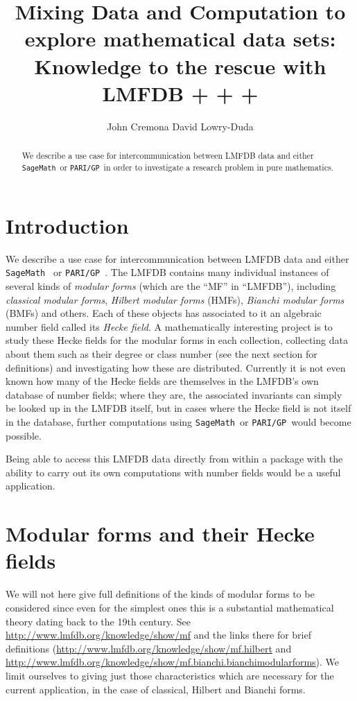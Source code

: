 \documentclass{llncs}
\title{Mixing Data and Computation to explore mathematical data sets:
Knowledge to the rescue with LMFDB + \Sage + \Pari + \MitM}
\author{
John Cremona\inst{1}
David Lowry-Duda\inst{1}
}
\institute{
University of Warwick
}
\def\Sage{{\tt SageMath}}
\def\Pari{{\tt PARI/GP}}
\begin{document}
\maketitle
\begin{abstract}
  We describe a use case for intercommunication between LMFDB data and
  either \Sage\ or \Pari\ in order to investigate a research problem
  in pure mathematics.
\end{abstract}

\section{Introduction}
We describe a use case for intercommunication between LMFDB data and
either \Sage\ \cite{sage} or \Pari\ \cite{pari}.  The LMFDB contains
many individual instances of several kinds of \emph{modular forms}
(which are the ``MF'' in ``LMFDB''), including \emph{classical modular
  forms}, \emph{Hilbert modular forms} (HMFs), \emph{Bianchi modular
  forms} (BMFs) and others.  Each of these objects has associated to
it an algebraic number field called its \emph{Hecke field}.  A
mathematically interesting project is to study these Hecke fields for
the modular forms in each collection, collecting data about them such
as their degree or class number (see the next section for definitions)
and investigating how these are distributed.  Currently it is not even
known how many of the Hecke fields are themselves in the LMFDB's own
database of number fields; where they are, the associated invariants
can simply be looked up in the LMFDB itself, but in cases where the
Hecke field is not itself in the database, further computations using
\Sage\ or \Pari\ would become possible.

Being able to access this LMFDB data directly from within a package
with the ability to carry out its own computations with number fields
would be a useful application.

\section{Modular forms and their Hecke fields}
We will not here give full definitions of the kinds of modular forms
to be considered since even for the simplest ones this is a
substantial mathematical theory dating back to the 19th century.  See
\url{http://www.lmfdb.org/knowledge/show/mf} and the links there for
brief definitions
(\url{http://www.lmfdb.org/knowledge/show/mf.hilbert} and
\url{http://www.lmfdb.org/knowledge/show/mf.bianchi.bianchimodularforms}).
We limit ourselves to giving just those characteristics which are
necessary for the current application, in the case of classical,
Hilbert and Bianchi forms.
\end{document}
